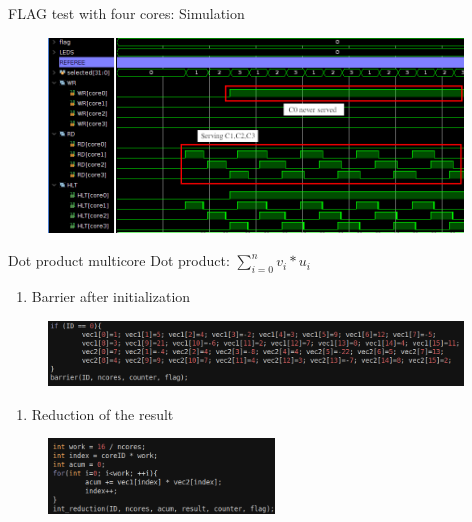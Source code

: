 \begin{frame}{FLAG test with four cores: Simulation}
\begin{figure}
    \centering
    \includegraphics[width=11cm]{images/flag4_sim_bad_crop_arrow.png}
    \label{fig:my_label}
\end{figure}
\end{frame}


\begin{frame}{Dot product multicore}
Dot product: $\sum_{i=0}^{n}{v_{i} * u_{i}}$
\vspace{0.2cm}
\begin{enumerate}
    \item Barrier after initialization
\end{enumerate}
\begin{figure}
    \centering
    \includegraphics[width=11cm]{images/axpy_ini.png}
    \label{fig:my_label}
\end{figure}

\begin{enumerate}
    \item Reduction of the result
\end{enumerate}
\begin{figure}
    \centering
    \includegraphics[width=6cm]{images/axpy_body.png}
    \label{fig:my_label}
\end{figure}


\end{frame}

